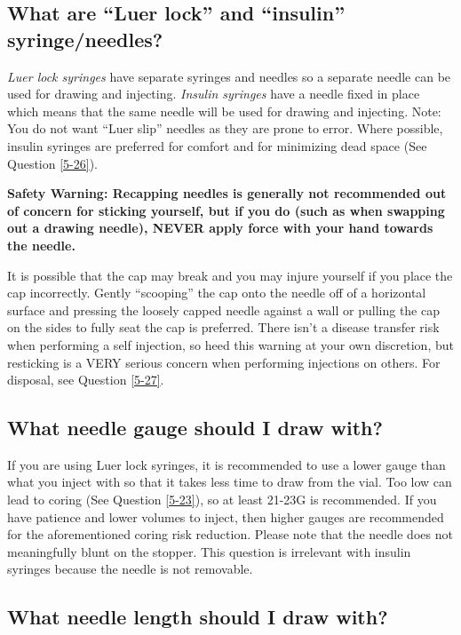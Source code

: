 \documentclass{article}
\begin{document}
\subsection{What are “Luer lock” and “insulin” syringe/needles?}\label{5-13}

\textit{Luer lock syringes} have separate syringes and needles so a separate needle can be used for drawing and injecting. \textit{Insulin syringes} have a needle fixed in place which means that the same needle will be used for drawing and injecting. Note: You do not want “Luer slip” needles as they are prone to error. Where possible, insulin syringes are preferred for comfort and for minimizing dead space (See Question \ref{5-26}).

\textbf{Safety Warning: Recapping needles is generally not recommended out of concern for sticking yourself, but if you do (such as when swapping out a drawing needle), NEVER apply force with your hand towards the needle.}

It is possible that the cap may break and you may injure yourself if you place the cap incorrectly. Gently “scooping” the cap onto the needle off of a horizontal surface and pressing the loosely capped needle against a wall or pulling the cap on the sides to fully seat the cap is preferred. There isn't a disease transfer risk when performing a self injection, so heed this warning at your own discretion, but resticking is a VERY serious concern when performing injections on others. For disposal, see Question \ref{5-27}.

\subsection{What needle gauge should I draw with?}

If you are using Luer lock syringes, it is recommended to use a lower gauge than what you inject with so that it takes less time to draw from the vial. Too low can lead to coring (See Question \ref{5-23}), so at least 21-23G is recommended. If you have patience and lower volumes to inject, then higher gauges are recommended for the aforementioned coring risk reduction. Please note that the needle does not meaningfully blunt on the stopper. This question is irrelevant with insulin syringes because the needle is not removable.

\subsection{What needle length should I draw with?}
\end{document}
